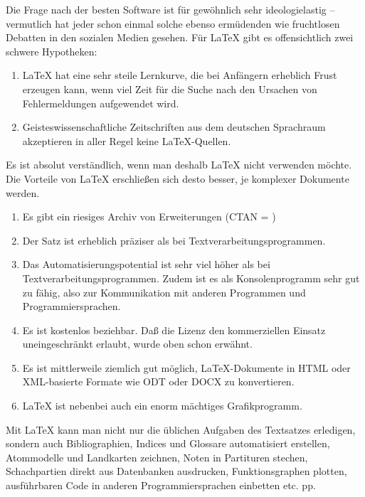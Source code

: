 \documentclass[11pt,table]{scrreprt}
\begin{document}
Die Frage nach der besten Software ist für gewöhnlich sehr ideologielastig -- vermutlich hat jeder schon  einmal solche ebenso ermüdenden wie fruchtlosen Debatten in den sozialen Medien gesehen. Für \LaTeX{} gibt es offensichtlich zwei schwere Hypotheken:
\begin{enumerate}
\item \LaTeX{} hat eine sehr steile Lernkurve, die bei Anfängern erheblich Frust erzeugen kann, wenn viel Zeit für die Suche nach den Ursachen von Fehlermeldungen aufgewendet wird.
\item Geisteswissenschaftliche Zeitschriften aus dem deutschen Sprachraum akzeptieren in aller Regel keine \LaTeX-Quellen.
\end{enumerate}
Es ist absolut verständlich, wenn man deshalb \LaTeX{} nicht verwenden möchte. Die Vorteile von \LaTeX{} erschließen sich desto besser, je komplexer Dokumente werden.
\begin{enumerate}
\item Es gibt ein riesiges Archiv von Erweiterungen (CTAN = )
\item Der Satz ist erheblich präziser als bei Textverarbeitungsprogrammen.
\item Das Automatisierungspotential ist sehr viel höher als bei Textverarbeitungsprogrammen. Zudem ist es als Konsolenprogramm sehr gut zu  fähig, also zur Kommunikation mit anderen Programmen und Programmiersprachen.
\item Es ist kostenlos beziehbar. Daß die Lizenz den kommerziellen Einsatz uneingeschränkt erlaubt, wurde oben schon erwähnt.
\item Es ist mittlerweile ziemlich gut möglich, \LaTeX-Dokumente in HTML oder XML-basierte Formate wie ODT oder DOCX zu konvertieren.
\item \LaTeX{} ist nebenbei auch ein enorm mächtiges Grafikprogramm.
\end{enumerate}

Mit \LaTeX{} kann man nicht nur die üblichen Aufgaben des Textsatzes erledigen, sondern auch Bibliographien, Indices und Glossare automatisiert erstellen, Atommodelle und Landkarten zeichnen, Noten in Partituren stechen, Schachpartien direkt aus Datenbanken ausdrucken, Funktionsgraphen plotten, ausführbaren Code in anderen Programmiersprachen einbetten etc. pp.
\end{document}
